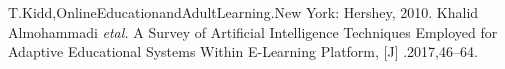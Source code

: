 \documentclass[a4paper,12pt,twocolumn]{article}
\begin{document}
	\begin{thebibliography}{99}
	  T.Kidd,OnlineEducationandAdultLearning.New York: Hershey, 2010.
	    Khalid Almohammadi \emph{etal.} A Survey of Artificial Intelligence Techniques Employed for  Adaptive Educational Systems Within E-Learning Platform, [J] .2017,46--64.
\end{thebibliography}
\end{document}
